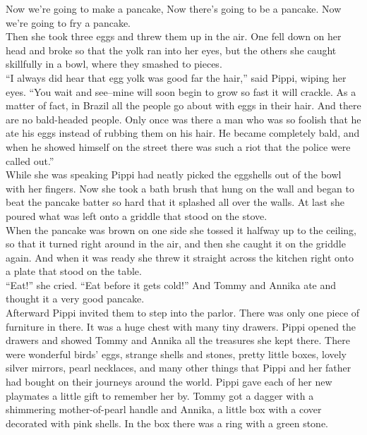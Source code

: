 \documentclass{standard}
\begin{document}
Now we’re going to make a pancake, Now there’s going to be a pancake. Now we’re going to fry a pancake.\\

Then she took three eggs and threw them up in the air. One fell down on her head and broke so that the yolk ran into her eyes, but the others she caught skillfully in a bowl, where they smashed to pieces.\\

``I always did hear that egg yolk was good far the hair,” said Pippi, wiping her eyes. ``You wait and see--mine will soon begin to grow so fast it will crackle. As a matter of fact, in Brazil all the people go about with eggs in their hair. And there are no bald-headed people. Only once was there a man who was so foolish that he ate his eggs instead of rubbing them on his hair. He became completely bald, and when he showed himself on the street there was such a riot that the police were called out.”\\

While she was speaking Pippi had neatly picked the eggshells out of the bowl with her fingers. Now she took a bath brush that hung on the wall and began to beat the pancake batter so hard that it splashed all over the walls. At last she poured what was left onto a griddle that stood on the stove.\\

When the pancake was brown on one side she tossed it halfway up to the ceiling, so that it turned right around in the air, and then she caught it on the griddle again. And when it was ready she threw it straight across the kitchen right onto a plate that stood on the table.\\

``Eat!” she cried. ``Eat before it gets cold!” And Tommy and Annika ate and thought it a very good pancake.\\

Afterward Pippi invited them to step into the parlor. There was only one piece of furniture in there. It was a huge chest with many tiny drawers. Pippi opened the drawers and showed Tommy and Annika all the treasures she kept there. There were wonderful birds’ eggs, strange shells and stones, pretty little boxes, lovely silver mirrors, pearl necklaces, and many other things that Pippi and her father had bought on their journeys around the world. Pippi gave each of her new playmates a little gift to remember her by. Tommy got a dagger with a shimmering mother-of-pearl handle and Annika, a little box with a cover decorated with pink shells. In the box there was a ring with a green stone.\\
\end{document}
